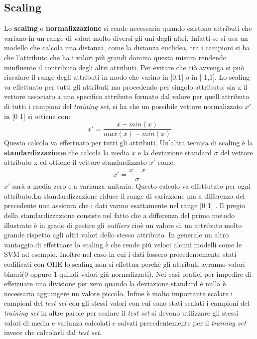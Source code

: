 \subsection{Scaling}
\label{subsub:scal}
Lo \textbf{scaling} o \textbf{normalizzazione} si rende necessaria quando esistono attributi che variano in un range di valori molto diversi gli uni dagli altri. Infatti se si usa un modello che calcola una distanza, come la distanza euclidea, tra i campioni si ha che l'attributo che ha i valori più grandi domina questa misura rendendo ininfluente il contributo degli altri attributi. Per evitare che ciò avvenga si può riscalare il range degli attributi in modo che varino in [0,1] o in [-1,1]. Lo scaling va effettuato per tutti gli attributi ma procedendo per singolo attributo: sia x il vettore associato a uno specifico attributo formato dal valore per quell attributo di tutti i campioni del \textit{training set}, si ha che un possibile vettore normalizzato $x'$ in [0 1] si ottiene con:
\begin{equation*}
x' = \frac{x - min(x)}{max(x) - min(x)}
\end{equation*}  
Questo calcolo va effettuato per tutti gli attributi.
Un'altra tecnica di scaling è la \textbf{standardizzazione} che  calcola la media $\overline{x}$ e la deviazione standard $\sigma$ del vettore attributo x ed ottiene il vettore standardizzato $x'$ come:
\begin{equation}
\label{eq:stand}
x' = \frac{x - \overline{x}}{\sigma}
\end{equation}  
$x'$ sarà a media zero e a varianza unitaria. Questo calcolo va effettutato per ogni attributo.La standardizzazione riduce il range di variazione ma a differenza del precedente non assicura che i dati varino esattamente nel range [0 1] . Il pregio della standardizzazione consiste nel fatto che a differenza del primo metodo illustrato è in grado di gestire gli \textit{outliers} cioè un valore di un attributo molto grande rispetto agli altri valori dello stesso attributo.
In generale un altro vantaggio di effettuare lo scaling è che rende più veloci alcuni modelli come le \ac{SVM} ad esempio. Inoltre nel caso in cui i dati fossero precedentemente stati codificati con \ac{OHE} lo scaling non si effettua perchè gli attributi avranno valori binari(0 oppure 1 quindi valori già normalizzati).
Nei casi pratici per impedire di effettuare una divisione per zero quando la deviazione standard è nulla è necessario aggiungere un valore piccolo. Infine è molto importante scalare i campioni del \textit{test set} con gli stessi valori con cui sono stati scalati i campioni del \textit{training set} in altre parole per scalare il \textit{test set} si devono utilizzare gli stessi valori di media e varianza calcolati e salvati precedentemente per il \textit{training set}  invece che calcolarli dal \textit{test set}. 


